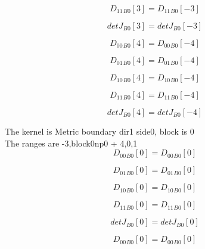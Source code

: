 \documentclass{article}
\begin{document}
\begin{dmath}{D_{11}{_{B0}}}[{3}] = {D_{11}{_{B0}}}[{-3}]\end{dmath}

\begin{dmath}{detJ{_{B0}}}[{3}] = {detJ{_{B0}}}[{-3}]\end{dmath}

\begin{dmath}{D_{00}{_{B0}}}[{4}] = {D_{00}{_{B0}}}[{-4}]\end{dmath}

\begin{dmath}{D_{01}{_{B0}}}[{4}] = {D_{01}{_{B0}}}[{-4}]\end{dmath}

\begin{dmath}{D_{10}{_{B0}}}[{4}] = {D_{10}{_{B0}}}[{-4}]\end{dmath}

\begin{dmath}{D_{11}{_{B0}}}[{4}] = {D_{11}{_{B0}}}[{-4}]\end{dmath}

\begin{dmath}{detJ{_{B0}}}[{4}] = {detJ{_{B0}}}[{-4}]\end{dmath}

\noindent The kernel is Metric boundary dir1 side0, block is 0\\\noindent The ranges are -3,block0np0 + 4,0,1\\\begin{dmath}{D_{00}{_{B0}}}[{0}] = {D_{00}{_{B0}}}[{0}]\end{dmath}

\begin{dmath}{D_{01}{_{B0}}}[{0}] = {D_{01}{_{B0}}}[{0}]\end{dmath}

\begin{dmath}{D_{10}{_{B0}}}[{0}] = {D_{10}{_{B0}}}[{0}]\end{dmath}

\begin{dmath}{D_{11}{_{B0}}}[{0}] = {D_{11}{_{B0}}}[{0}]\end{dmath}

\begin{dmath}{detJ{_{B0}}}[{0}] = {detJ{_{B0}}}[{0}]\end{dmath}

\begin{dmath}{D_{00}{_{B0}}}[{0}] = {D_{00}{_{B0}}}[{0}]\end{dmath}
\end{document}
